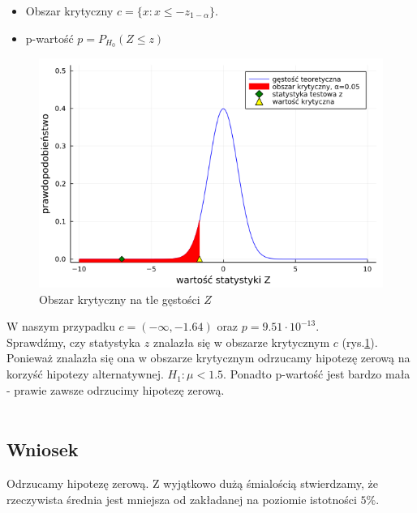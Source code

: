 \documentclass{article}
\theoremstyle{break}
\begin{document}
\begin{itemize}
	\item Obszar krytyczny $c=\{x: x\leq -z_{1-\alpha}\}$.
	\item p-wartość $p=P_{H_0}(Z\leq z)$
\end{itemize}
\begin{figure}[H]
	\begin{center}
		\includegraphics[scale=0.5]{Z1.3.png}
		\caption{Obszar krytyczny na tle gęstości $Z$}
		\label{fig:3}
	\end{center}
\end{figure}
W naszym przypadku $c=(-\infty,-1.64)$ oraz $p=9.51\cdot 10^{-13}$.\\
Sprawdźmy, czy statystyka $z$ znalazła się w obszarze krytycznym $c$  (rys.\ref{fig:3}).  Ponieważ znalazła się ona w obszarze krytycznym odrzucamy hipotezę zerową na korzyść hipotezy alternatywnej. $H_1: \mu < 1.5$. Ponadto p-wartość jest bardzo mała - prawie zawsze odrzucimy hipotezę zerową.\\ \\

\subsection*{Wniosek}
Odrzucamy hipotezę zerową. Z wyjątkowo dużą śmialością stwierdzamy, że rzeczywista średnia jest mniejsza od zakładanej na poziomie istotności $5\%$.
\newpage
\end{document}
